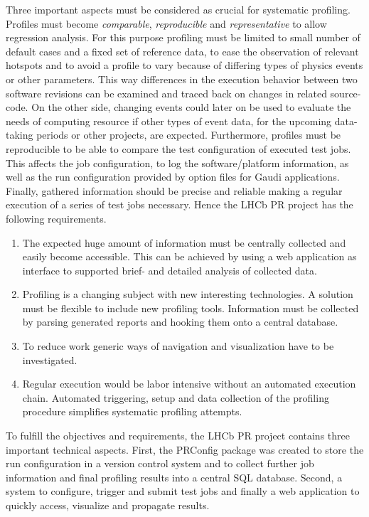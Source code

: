 \documentclass[a4paper]{jpconf}
\begin{document}
Three important aspects must be considered as crucial for systematic profiling. Profiles must become \textit{comparable}, \textit{reproducible} and \textit{representative} to allow regression analysis. For this purpose profiling must be limited to small number of default cases and a fixed set of reference data, to ease the observation of relevant hotspots and to avoid a profile to vary because of differing types of physics events or other parameters. This way differences in the execution behavior between two software revisions can be examined and traced back on changes in related source-code. On the other side, changing events could later on be used to evaluate the needs of computing resource if other types of event data, for the upcoming data-taking periods or other projects, are expected.
\newline
Furthermore, profiles must be reproducible to be able to compare the test configuration of executed test jobs. This affects the job configuration, to log the software/platform information, as well as the run configuration provided by option files for Gaudi applications. Finally, gathered information should be precise and reliable making a regular execution of a series of test jobs necessary.
\newline
Hence the LHCb PR project has the following requirements.
\begin{enumerate}
 \item The expected huge amount of information must be centrally collected and easily become accessible. This can be achieved by using a web application as interface to supported brief- and detailed analysis of collected data. 
 \item Profiling is a changing subject with new interesting technologies. A solution must be flexible to include new profiling tools. Information must be collected by parsing generated reports and hooking them onto a central database.
 \item To reduce work generic ways of navigation and visualization have to be investigated.
 \item Regular execution would be labor intensive without an automated execution chain. Automated triggering, setup and data collection of the profiling procedure simplifies systematic profiling attempts.
\end{enumerate}
To fulfill the objectives and requirements, the LHCb PR project contains three important technical aspects. First, the PRConfig package was created to store the run configuration in a version control system and to collect further job information and final profiling results into a central SQL database. Second, a system to configure, trigger and submit test jobs and finally a web application to quickly access, visualize and propagate results.
\end{document}
